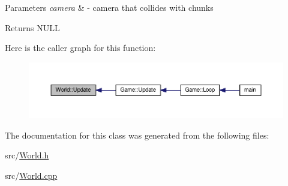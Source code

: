 \begin{DoxyParams}{Parameters}
{\em camera} & -\/ camera that collides with chunks\\
\hline
\end{DoxyParams}
\begin{DoxyReturn}{Returns}
N\+U\+L\+L 
\end{DoxyReturn}


Here is the caller graph for this function\+:\nopagebreak
\begin{figure}[H]
\begin{center}
\leavevmode
\includegraphics[width=350pt]{class_world_a48ae860aaeca4178c206900fa6a7871b_icgraph}
\end{center}
\end{figure}




The documentation for this class was generated from the following files\+:\begin{DoxyCompactItemize}
\item 
src/\hyperlink{_world_8h}{World.\+h}\item 
src/\hyperlink{_world_8cpp}{World.\+cpp}\end{DoxyCompactItemize}
